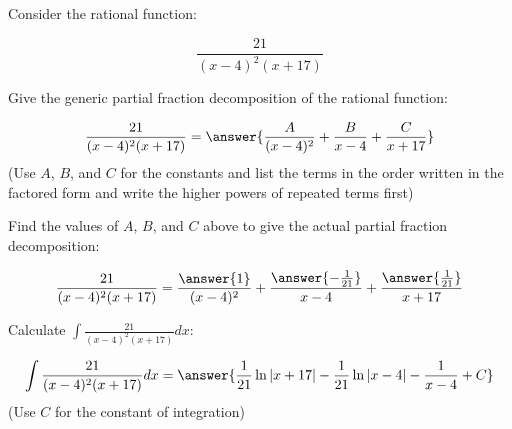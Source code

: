 \documentclass{ximera}
\author{Nicholas Hemleben and Jim Talamo}
\begin{document}
\begin{exercise}


Consider the rational function:

\[ 
\frac{21}{(x-4)^2(x+17)} 
\]

Give the generic partial fraction decomposition of the rational function:

\[
\frac{21}{(x-4)^2(x+17)} =
\answer{\frac{A}{(x-4)^2} + \frac{B}{x-4} + \frac{C}{x+17}}
\]
(Use $A$, $B$, and $C$ for the constants and list the terms in the order written in the factored form and write the higher powers of repeated terms first)

\begin{exercise}
Find the values of $A$, $B$, and $C$ above to give the actual partial fraction decomposition:

\[
\frac{21}{(x-4)^2(x+17)} =
 \frac{\answer{1}}{{(x-4)^2}} + 
\frac{\answer{-\frac{1}{21}}}{{x-4}} +
 \frac{\answer{\frac{1}{21}}}{{x+17}}
\]
\end{exercise}

\begin{exercise}
Calculate $\int \frac{21}{(x-4)^2(x+17)} dx $:

\[ 
\int \frac{21}{(x-4)^2(x+17)} dx = \answer{\frac{1}{21} \ln|x+17|-\frac{1}{21}\ln|x-4|-\frac{1}{x-4}+C}
\]
(Use $C$ for the constant of integration)

\end{exercise}
\end{exercise}
\end{document}
